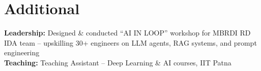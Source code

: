 \documentclass[letterpaper,10pt]{article}
\begin{document}
\section{Additional}
\begin{itemize}[leftmargin=0.15in, label={}]
\small{\item{
    \textbf{Leadership:} Designed \& conducted ``AI IN LOOP'' workshop for MBRDI RD IDA team -- upskilling 30+ engineers on LLM agents, RAG systems, and prompt engineering \\
    \textbf{Teaching:} Teaching Assistant -- Deep Learning \& AI courses, IIT Patna
}}
\end{itemize}
\end{document}

